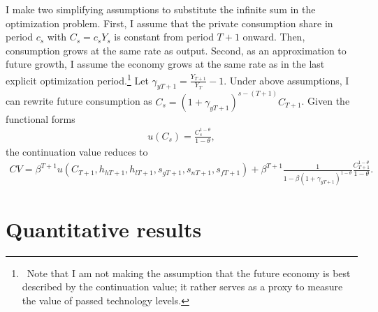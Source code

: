 I make two simplifying assumptions to substitute the infinite sum in the optimization problem. First, 
I assume that the private consumption share in period $c_s$ with $C_s=c_sY_s$ is constant from period $T+1$ onward.  Then, consumption grows at the same rate as output. 
Second, as an approximation to future growth, I assume the economy grows at the same rate as in the last explicit optimization period.\footnote{\ Note that I am not making the assumption that the future economy is best described by the continuation value; it rather serves as a proxy to measure the value of passed technology levels. } 
Let $\gamma_{yT+1}=\frac{Y_{T+1}}{Y_{T}}-1$. Under above assumptions, I can rewrite future consumption as $C_s=(1+\gamma_{yT+1})^{s-(T+1)}C_{T+1}$.
Given the functional forms
\begin{align*}
u(C_s)= \frac{C_s^{1-\theta}}{1-\theta},
\end{align*}
the continuation value reduces to
\begin{align*}
CV= \beta^{T+1} u(C_{T+1},h_{h{T+1}}, h_{l{T+1}}, s_{g{T+1}}, s_{n{T+1}}, s_{f{T+1}})+\beta^{T+1}\frac{1}{1-\beta (1+\gamma_{yT+1})^{1-\theta}}\frac{C_{T+1}^{1-\theta}}{1-\theta}.
\end{align*}
%

\section{Quantitative results}\label{app:quant_res}

